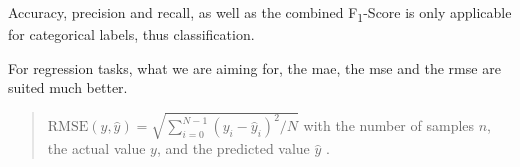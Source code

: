 %
%
%
%

Accuracy, precision and recall, as well as the combined F\textsubscript{1}-Score is only applicable for categorical labels, thus classification.

For regression tasks, what we are aiming for, the \gls{mae}, the \gls{mse} and the \gls{rmse} are suited much better.

\begin{quote}
\begin{math}
\text{RMSE}(y, \hat{y}) = \sqrt{\sum_{i=0}^{N - 1} (y_i - \hat{y}_i)^2 / N }
\end{math}\newline
with the number of samples $n$, the actual value $y$, and the predicted value $\hat{y}$ \cite{MAE_RMSE}.
\end{quote}

